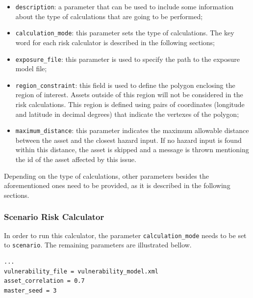 \begin{itemize}
\item  \Verb+description+: a parameter that can be used to include some information about the type of calculations that are going to be performed;
\item  \Verb+calculation_mode+: this parameter sets the type of calculations. The key word for each risk calculator is described in the following sections;
\item  \Verb+exposure_file+: this parameter is used to specify the path to the exposure model file;
\item  \Verb+region_constraint+: this field is used to define the polygon enclosing the region of interest. Assets outside of this region will not be considered in the risk calculations. This region is defined using pairs of coordinates (longitude and latitude in decimal degrees) that indicate the vertexes of the polygon;
\item  \Verb+maximum_distance+: this parameter indicates the maximum allowable distance between the asset and the closest hazard input. If no hazard input is found within this distance, the asset is skipped and a message is thrown mentioning the id of the asset affected by this issue.
\end{itemize}

Depending on the type of calculations, other parameters besides the aforementioned ones need to be provided, as it is described in the following sections.

\subsubsection{Scenario Risk Calculator}
In order to run this calculator, the parameter \Verb+calculation_mode+ needs to be set to \Verb+scenario+. The remaining parameters are illustrated bellow.

\begin{Verbatim}[frame=single, commandchars=\\\{\}, samepage=true]
...
vulnerability_file = vulnerability_model.xml
asset_correlation = 0.7
master_seed = 3
\end{Verbatim}

